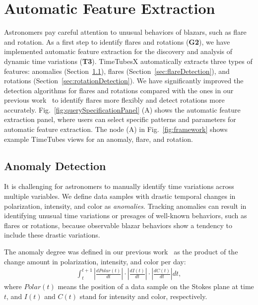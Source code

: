 \section{Automatic Feature Extraction}\label{sec:automaticExtraction}
Astronomers pay careful attention to unusual behaviors of blazars, such as flare and rotation.
As a first step to identify flares and rotations (\textbf{G2}),
we have implemented automatic feature extraction for the discovery and analysis of dynamic time variations (\textbf{T3}).
TimeTubesX automatically extracts three types of features: anomalies (Section~\ref{sec:anomalyDetection}), flares (Section~\ref{sec:flareDetection}), and rotations (Section~\ref{sec:rotationDetection}).
We have significantly improved the detection algorithms for flares and rotations compared with the ones in our previous work~\cite{Sawada2018} 
to identify flares more flexibly and detect rotations more accurately.
Fig.~\ref{fig:querySpecificationPanel} (A) shows the automatic feature extraction panel,
where users can select specific patterns and parameters for automatic feature extraction.
The node (A) in Fig.~\ref{fig:framework} shows example TimeTubes views for an anomaly, flare, and rotation.

\subsection{Anomaly Detection}\label{sec:anomalyDetection}
It is challenging for astronomers to manually identify time variations across multiple variables. 
We define data samples with drastic temporal changes in polarization, intensity, and color as \textit{anomalies}.
Tracking anomalies can result in identifying unusual time variations or presages of well-known behaviors, such as flares or rotations,
because observable blazar behaviors show a tendency to include these drastic variations.

The anomaly degree was defined in our previous work~\cite{Sawada2018} as the product of the change amount in polarization, intensity, and color per day:
\begin{equation*}
\begin{split}
  \int_t^{t + 1}\left|\frac{dPolar(t)}{dt}\right|\cdot\left|\frac{dI(t)}{dt}\right|\cdot\left|\frac{dC(t)}{dt}\right|dt,
  \label{eq:anomaly}
\end{split}
\end{equation*}
where $Polar(t)$ means the position of a data sample on the Stokes plane at time $t$, and $I(t)$ and $C(t)$ stand for intensity and color, respectively. 

